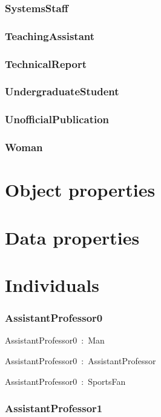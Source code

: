 \documentclass{article}
\begin{document}
\subsubsection*{SystemsStaff}

\subsubsection*{TeachingAssistant}

\subsubsection*{TechnicalReport}

\subsubsection*{UndergraduateStudent}

\subsubsection*{UnofficialPublication}

\subsubsection*{Woman}

\section*{Object properties}\section*{Data properties}\section*{Individuals}\subsubsection*{AssistantProfessor0}

AssistantProfessor0~:~Man

AssistantProfessor0~:~AssistantProfessor

AssistantProfessor0~:~SportsFan

\subsubsection*{AssistantProfessor1}
\end{document}
